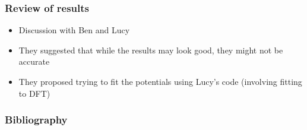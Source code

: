 \documentclass{beamer}
\begin{document}
\begin{frame}
\frametitle{Review of results}

\begin{itemize}
  \item Discussion with Ben and Lucy
  \item They suggested that while the results may look good, they might not be accurate
  \item They proposed trying to fit the potentials using Lucy's code (involving fitting to DFT)
\end{itemize}

\end{frame}

\begin{frame}[shrink=20]
\frametitle{Bibliography}



\end{frame}
\end{document}
